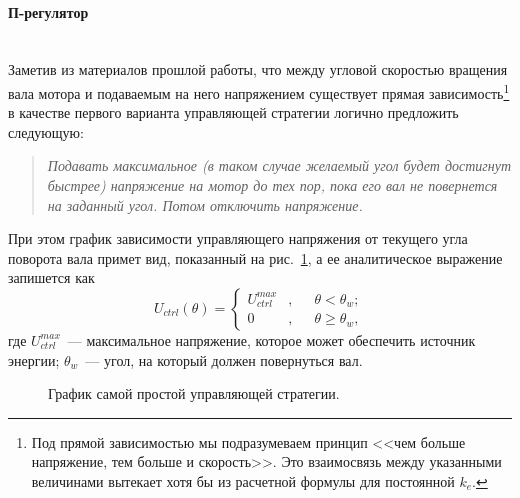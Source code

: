 \documentclass[12pt,a4paper,openany]{extarticle}
\begin{document}
\paragraph*{П-регулятор}$\phantom{-}$\\
\hspace*{\parindent}Заметив из материалов прошлой работы, что между угловой скоростью вращения вала мотора и подаваемым на него напряжением существует прямая зависимость\lefteqn{,}\footnote{Под прямой зависимостью мы подразумеваем принцип <<чем больше напряжение, тем больше и скорость>>.
Это взаимосвязь между указанными величинами вытекает хотя бы из расчетной формулы для постоянной $k_e$.} в качестве первого варианта управляющей стратегии логично предложить следующую:
\begin{quote}
\textsl{Подавать максимальное (в таком случае желаемый угол будет достигнут быстрее) напряжение на мотор до тех пор, пока его вал не повернется на заданный угол.
Потом отключить напряжение.} 
\end{quote}
При этом график зависимости управляющего напряжения от текущего угла поворота вала примет вид, показанный на рис.~\ref{1_graph}, а ее аналитическое выражение запишется как
\begin{equation}
	U_{ctrl}(\theta) = 
	\left\{	
	\begin{aligned} 
		\!U_{ctrl}^{max}\!&, &&\theta < \theta_w; \\
		\!0&, &&\theta \geqslant \theta_w,
	\end{aligned}
	\right.	
\end{equation}
где $U_{ctrl}^{max}$~--- максимальное напряжение, которое может обеспечить источник энергии; $\theta_w$~--- угол, на который должен повернуться вал.

\begin{figure}[h]
	\noindent{}
	\caption{График самой простой управляющей стратегии.}
	\label{1_graph}
\end{figure}
\end{document}
